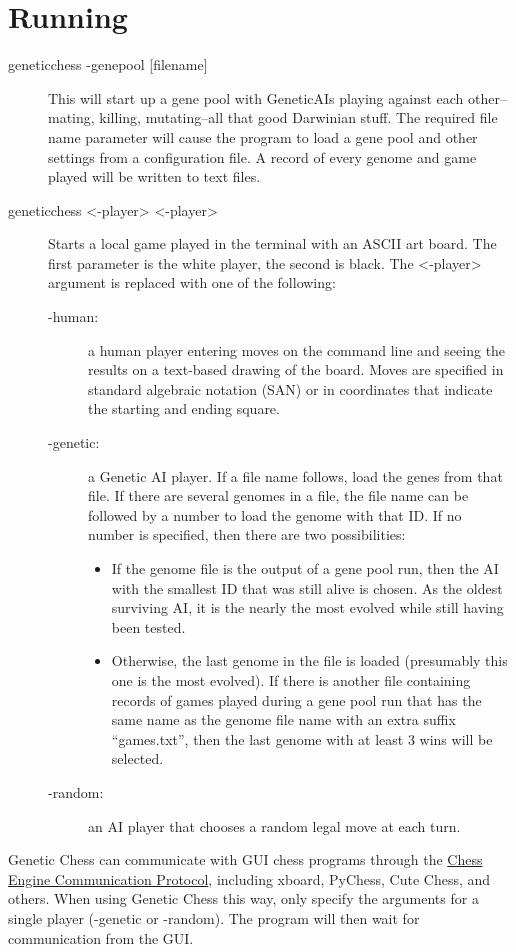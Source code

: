 \documentclass[letterpaper]{article}
\newcommand{\code}[1]{\textsf{#1}}
\renewcommand{\_}{\allowbreak\textunderscore\allowbreak}
\begin{document}
\section{Running}
\label{running}
\begin{description}
	\item[\code{genetic\_chess -genepool [file\_name]}]
This will start up a gene pool with Genetic\_AIs playing against each other--mating, killing, mutating--all that good Darwinian stuff. The required file name parameter will cause the program to load a gene pool and other settings from a configuration file. A record of every genome and game played will be written to text files.

	\item[\code{genetic\_chess <-player> <-player>}] Starts a local game played in the terminal with an ASCII art board. The first parameter is the white player, the second is black. The \code{<-player>} argument is replaced with one of the following:
	\begin{description}
		\item[\code{-human}:] a human player entering moves on the command line and seeing the results on a text-based drawing of the board. Moves are specified in standard algebraic notation (SAN) or in coordinates that indicate the starting and ending square. 
		\item[\code{-genetic}:] a Genetic AI player. If a file name follows, load the genes from that file. If there are several genomes in a file, the file name can be followed by a number to load the genome with that ID. If no number is specified, then there are two possibilities:
		\begin{itemize}
			\item If the genome file is the output of a gene pool run, then the AI with the smallest ID that was still alive is chosen. As the oldest surviving AI, it is the nearly the most evolved while still having been tested.
			\item Otherwise, the last genome in the file is loaded (presumably this one is the most evolved). If there is another file containing records of games played during a gene pool run that has the same name as the genome file name with an extra suffix ``\_games.txt'', then the last genome with at least 3 wins will be selected.
		\end{itemize}
		\item[\code{-random}:] an AI player that chooses a random legal move at each turn.
	\end{description}
\end{description}
Genetic Chess can communicate with GUI chess programs through the \href{https://www.gnu.org/software/xboard/engine-intf.html}{Chess Engine Communication Protocol}, including xboard, PyChess, Cute Chess, and others. When using Genetic Chess this way, only specify the arguments for a single player (\code{-genetic} or \code{-random}). The program will then wait for communication from the GUI.
\end{document}
